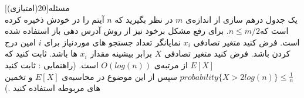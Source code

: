 ‌مسئله[20(امتیازی)]  
\\
یک جدول درهم سازی از اندازه‌ی $m$  در نظر بگیرید که $n$ آیتم را در خودش ذخیره کرده است که$n \le m/2$. برای رفع مشکل برخود نیز از روش آدرس دهی باز استفاده شده است. فرض کنید متغیر تصادفی $ x_i$  نمایانگر تعداد جستجو های موردنیاز  برای $i$  امین درج کردن باشد. فرض کنید متغیر تصادفی $X$  برابر بیشینه مقدار $x_i$ ها باشد. ثابت کنید که $E[X]$  از مرتبه‌ی $ O(log(n))$ است. (راهنمایی :‌ ثابت کنید $probability \{X > 2log(n)\} \le \frac{1}{n}$ سپس از این موضوع در محاسبه‌ی $E[X]$ و تخمین های مربوطه استفاده کنید .) 










